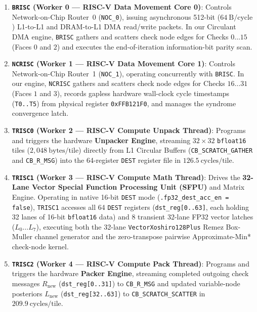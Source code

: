 \documentclass[10pt]{article}
\begin{document}
\begin{enumerate}[leftmargin=1.8em, itemsep=2pt]
    \item \textbf{\texttt{BRISC} (Worker 0 --- RISC-V Data Movement Core 0)}: Controls Network-on-Chip Router~0 (\texttt{NOC\_0}), issuing asynchronous 512-bit ($64\ \mathrm{B/cycle}$) L1-to-L1 and DRAM-to-L1 DMA read/write packets. In our Circulant DMA engine, \texttt{BRISC} gathers and scatters check node edges for Checks $0 \dots 15$ (Faces $0$ and $2$) and executes the end-of-iteration information-bit parity scan.
    \item \textbf{\texttt{NCRISC} (Worker 1 --- RISC-V Data Movement Core 1)}: Controls Network-on-Chip Router~1 (\texttt{NOC\_1}), operating concurrently with \texttt{BRISC}. In our engine, \texttt{NCRISC} gathers and scatters check node edges for Checks $16 \dots 31$ (Faces $1$ and $3$), records gapless hardware wall-clock cycle timestamps (\texttt{T0..T5}) from physical register \texttt{0xFFB121F0}, and manages the syndrome convergence latch.
    \item \textbf{\texttt{TRISC0} (Worker 2 --- RISC-V Compute Unpack Thread)}: Programs and triggers the hardware \textbf{Unpacker Engine}, streaming $32 \times 32$ \texttt{bfloat16} tiles ($2,048\ \mathrm{bytes/tile}$) directly from L1 Circular Buffers (\texttt{CB\_SCRATCH\_GATHER} and \texttt{CB\_R\_MSG}) into the 64-register \texttt{DEST} register file in $126.5\ \mathrm{cycles/tile}$.
    \item \textbf{\texttt{TRISC1} (Worker 3 --- RISC-V Compute Math Thread)}: Drives the \textbf{32-Lane Vector Special Function Processing Unit (SFPU)} and Matrix Engine. Operating in native 16-bit \texttt{DEST} mode (\texttt{.fp32\_dest\_acc\_en = false}), \texttt{TRISC1} accesses all 64 \texttt{DEST} registers (\texttt{dst\_reg[0..63]}, each holding 32 lanes of 16-bit \texttt{bfloat16} data) and 8 transient 32-lane FP32 vector latches ($L_0 \dots L_7$), executing both the 32-lane \texttt{VectorXoshiro128Plus} Remez Box-Muller channel generator and the zero-transpose pairwise Approximate-Min* check-node kernel.
    \item \textbf{\texttt{TRISC2} (Worker 4 --- RISC-V Compute Pack Thread)}: Programs and triggers the hardware \textbf{Packer Engine}, streaming completed outgoing check messages $R_{\mathrm{new}}$ (\texttt{dst\_reg[0..31]}) to \texttt{CB\_R\_MSG} and updated variable-node posteriors $L_{\mathrm{new}}$ (\texttt{dst\_reg[32..63]}) to \texttt{CB\_SCRATCH\_SCATTER} in $209.9\ \mathrm{cycles/tile}$.
\end{enumerate}
\end{document}
